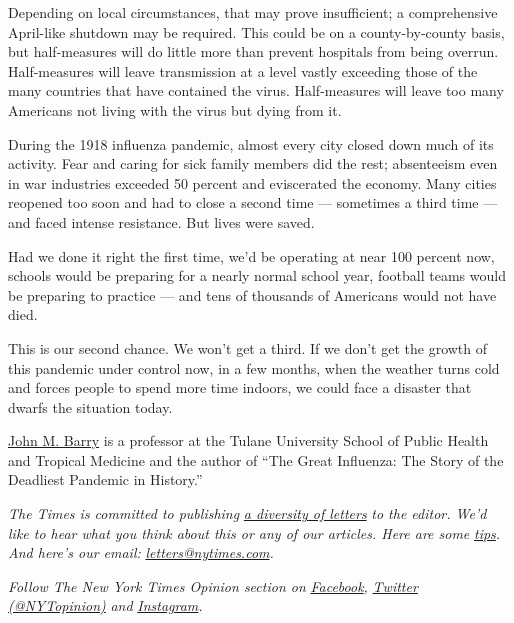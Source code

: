 Depending on local circumstances, that may prove insufficient; a
comprehensive April-like shutdown may be required. This could be on a
county-by-county basis, but half-measures will do little more than
prevent hospitals from being overrun. Half-measures will leave
transmission at a level vastly exceeding those of the many countries
that have contained the virus. Half-measures will leave too many
Americans not living with the virus but dying from it.

During the 1918 influenza pandemic, almost every city closed down much
of its activity. Fear and caring for sick family members did the rest;
absenteeism even in war industries exceeded 50 percent and eviscerated
the economy. Many cities reopened too soon and had to close a second
time --- sometimes a third time --- and faced intense resistance. But
lives were saved.

Had we done it right the first time, we'd be operating at near 100
percent now, schools would be preparing for a nearly normal school year,
football teams would be preparing to practice --- and tens of thousands
of Americans would not have died.

This is our second chance. We won't get a third. If we don't get the
growth of this pandemic under control now, in a few months, when the
weather turns cold and forces people to spend more time indoors, we
could face a disaster that dwarfs the situation today.

\href{http://www.johnmbarry.com/index.htm}{John M. Barry} is a professor
at the Tulane University School of Public Health and Tropical Medicine
and the author of ``The Great Influenza: The Story of the Deadliest
Pandemic in History.''

\emph{The Times is committed to publishing}
\href{https://www.nytimes.com/2019/01/31/opinion/letters/letters-to-editor-new-york-times-women.html}{\emph{a
diversity of letters}} \emph{to the editor. We'd like to hear what you
think about this or any of our articles. Here are some}
\href{https://help.nytimes.com/hc/en-us/articles/115014925288-How-to-submit-a-letter-to-the-editor}{\emph{tips}}\emph{.
And here's our email:}
\href{mailto:letters@nytimes.com}{\emph{letters@nytimes.com}}\emph{.}

\emph{Follow The New York Times Opinion section on}
\href{https://www.facebook.com/nytopinion}{\emph{Facebook}}\emph{,}
\href{http://twitter.com/NYTOpinion}{\emph{Twitter (@NYTopinion)}}
\emph{and}
\href{https://www.instagram.com/nytopinion/}{\emph{Instagram}}\emph{.}

